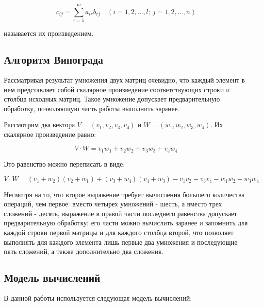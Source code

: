 \begin{equation}
    \label{eq:1.1}
    c_{ij} =
    \sum_{r=1}^{m} a_{ir} b_{rj} \quad (i=1,2,...,l; \ j=1,2,...,n)
\end{equation}

называется их произведением.

\pagebreak
\subsection{Алгоритм Винограда}

Рассматривая результат умножения двух матриц очевидно, что каждый элемент
в нем представляет собой скалярное произведение соответствующих строки и столбца исходных матриц.
Такое умножение допускает предварительную обработку,
позволяющую часть работы выполнить заранее.

Рассмотрим два вектора
$V = (v_1, v_2, v_3, v_4)$ и
$W = (w_1, w_2, w_3, w_4)$.
Их скалярное произведение равно:

\begin{equation}
    \label{eq:1.2}
    V \cdot W = v_1 w_1 + v_2 w_2 + v_3 w_3 + v_4 w_4
\end{equation}


Это равенство можно переписать в виде:

\begin{equation}
    \label{eq:1.2}
    V \cdot W = (v_1+w_2)(v_2+w_1)+(v_3+w_4)(v_4+w_3)-v_1v_2-v_3v_4-w_1w_2-w_3w_4
\end{equation}

Несмотря на то, что второе выражение требует вычисления большего
количества операций, чем первое: вместо четырех умножений - шесть,
а вместо трех сложений - десять, выражение в правой части последнего равенства
допускает предварительную обработку: его части можно вычислить заранее
и запомнить для каждой строки первой матрицы и для каждого столбца
второй, что позволяет выполнять для каждого элемента лишь первые два
умножения и последующие пять сложений, а также дополнительно два сложения.


\subsection{Модель вычислений}

В данной работы используется следующая модель вычислений:

